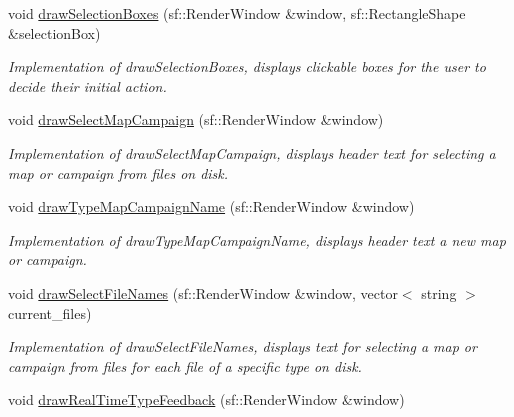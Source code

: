 \begin{DoxyCompactItemize}
\hypertarget{classUi_a0df18aae8c87d5b12a814d9a9f94e455}{}\label{classUi_a0df18aae8c87d5b12a814d9a9f94e455} 
void \hyperlink{classUi_a0df18aae8c87d5b12a814d9a9f94e455}{draw\+Selection\+Boxes} (sf\+::\+Render\+Window \&window, sf\+::\+Rectangle\+Shape \&selection\+Box)
\begin{DoxyCompactList}\small\item\em Implementation of draw\+Selection\+Boxes, displays clickable boxes for the user to decide their initial action. \end{DoxyCompactList}\item 
\hypertarget{classUi_a382680161b623c8707311fd08779f47e}{}\label{classUi_a382680161b623c8707311fd08779f47e} 
void \hyperlink{classUi_a382680161b623c8707311fd08779f47e}{draw\+Select\+Map\+Campaign} (sf\+::\+Render\+Window \&window)
\begin{DoxyCompactList}\small\item\em Implementation of draw\+Select\+Map\+Campaign, displays header text for selecting a map or campaign from files on disk. \end{DoxyCompactList}\item 
\hypertarget{classUi_a0c2c09ac830a1871adcc8047a2bf60e8}{}\label{classUi_a0c2c09ac830a1871adcc8047a2bf60e8} 
void \hyperlink{classUi_a0c2c09ac830a1871adcc8047a2bf60e8}{draw\+Type\+Map\+Campaign\+Name} (sf\+::\+Render\+Window \&window)
\begin{DoxyCompactList}\small\item\em Implementation of draw\+Type\+Map\+Campaign\+Name, displays header text a new map or campaign. \end{DoxyCompactList}\item 
\hypertarget{classUi_a15ab5e5a0e8df346d964411e9e330df6}{}\label{classUi_a15ab5e5a0e8df346d964411e9e330df6} 
void \hyperlink{classUi_a15ab5e5a0e8df346d964411e9e330df6}{draw\+Select\+File\+Names} (sf\+::\+Render\+Window \&window, vector$<$ string $>$ current\+\_\+files)
\begin{DoxyCompactList}\small\item\em Implementation of draw\+Select\+File\+Names, displays text for selecting a map or campaign from files for each file of a specific type on disk. \end{DoxyCompactList}\item 
\hypertarget{classUi_a8e191e760e89567854dcdcb789f9adad}{}\label{classUi_a8e191e760e89567854dcdcb789f9adad} 
void \hyperlink{classUi_a8e191e760e89567854dcdcb789f9adad}{draw\+Real\+Time\+Type\+Feedback} (sf\+::\+Render\+Window \&window)

\end{DoxyCompactItemize}
